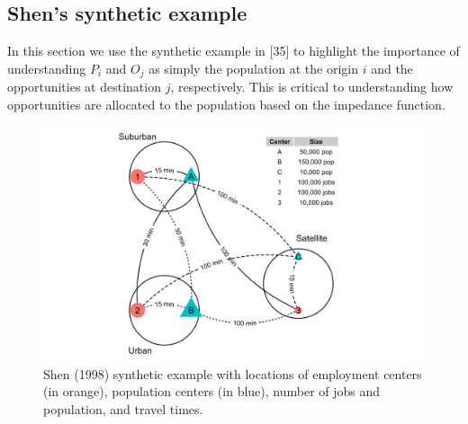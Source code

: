 \documentclass[10pt,letterpaper]{article}
\begin{document}
\hypertarget{shens-synthetic-example}{%
\subsection{Shen's synthetic example}\label{shens-synthetic-example}}

In this section we use the synthetic example in {[}35{]} to highlight
the importance of understanding \(P_i\) and \(O_j\) as simply the
population at the origin \(i\) and the opportunities at destination
\(j\), respectively. This is critical to understanding how opportunities
are allocated to the population based on the impedance function.

\begin{figure}

{\centering \includegraphics[width=1\linewidth]{images/Fig1} 

}

\caption{\label{fig:Fig1} Shen (1998) synthetic example with locations of employment centers (in orange), population centers (in blue), number of jobs and population, and travel times.}\label{fig:synthetic-example-plot}
\end{figure}

 
  \providecommand{\huxb}[2]{\arrayrulecolor[RGB]{#1}\global\arrayrulewidth=#2pt}
  \providecommand{\huxvb}[2]{\color[RGB]{#1}\vrule width #2pt}
  \providecommand{\huxtpad}[1]{\rule{0pt}{#1}}
  \providecommand{\huxbpad}[1]{\rule[-#1]{0pt}{#1}}
\end{document}
